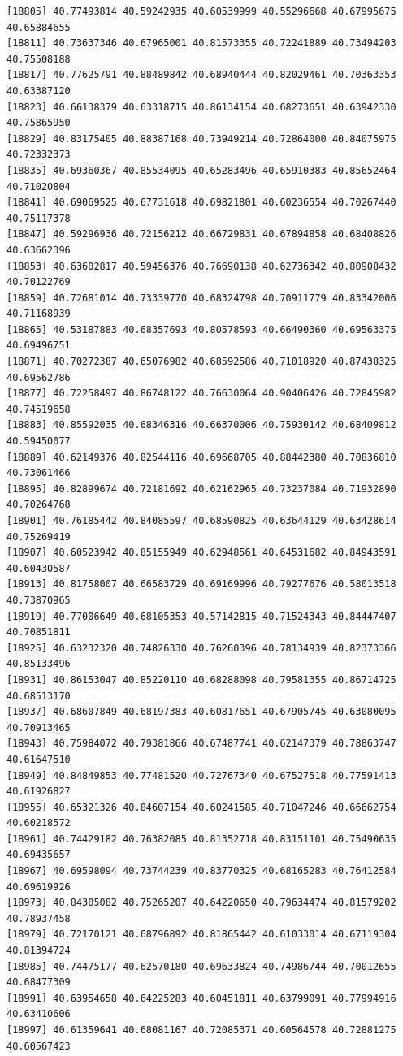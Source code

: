 \documentclass[
  letterpaper,
  DIV=11,
  numbers=noendperiod]{scrartcl}
\begin{document}
\begin{verbatim}
[18805] 40.77493814 40.59242935 40.60539999 40.55296668 40.67995675 40.65884655
[18811] 40.73637346 40.67965001 40.81573355 40.72241889 40.73494203 40.75508188
[18817] 40.77625791 40.88489842 40.68940444 40.82029461 40.70363353 40.63387120
[18823] 40.66138379 40.63318715 40.86134154 40.68273651 40.63942330 40.75865950
[18829] 40.83175405 40.88387168 40.73949214 40.72864000 40.84075975 40.72332373
[18835] 40.69360367 40.85534095 40.65283496 40.65910383 40.85652464 40.71020804
[18841] 40.69069525 40.67731618 40.69821801 40.60236554 40.70267440 40.75117378
[18847] 40.59296936 40.72156212 40.66729831 40.67894858 40.68408826 40.63662396
[18853] 40.63602817 40.59456376 40.76690138 40.62736342 40.80908432 40.70122769
[18859] 40.72681014 40.73339770 40.68324798 40.70911779 40.83342006 40.71168939
[18865] 40.53187883 40.68357693 40.80578593 40.66490360 40.69563375 40.69496751
[18871] 40.70272387 40.65076982 40.68592586 40.71018920 40.87438325 40.69562786
[18877] 40.72258497 40.86748122 40.76630064 40.90406426 40.72845982 40.74519658
[18883] 40.85592035 40.68346316 40.66370006 40.75930142 40.68409812 40.59450077
[18889] 40.62149376 40.82544116 40.69668705 40.88442380 40.70836810 40.73061466
[18895] 40.82899674 40.72181692 40.62162965 40.73237084 40.71932890 40.70264768
[18901] 40.76185442 40.84085597 40.68590825 40.63644129 40.63428614 40.75269419
[18907] 40.60523942 40.85155949 40.62948561 40.64531682 40.84943591 40.60430587
[18913] 40.81758007 40.66583729 40.69169996 40.79277676 40.58013518 40.73870965
[18919] 40.77006649 40.68105353 40.57142815 40.71524343 40.84447407 40.70851811
[18925] 40.63232320 40.74826330 40.76260396 40.78134939 40.82373366 40.85133496
[18931] 40.86153047 40.85220110 40.68288098 40.79581355 40.86714725 40.68513170
[18937] 40.68607849 40.68197383 40.60817651 40.67905745 40.63080095 40.70913465
[18943] 40.75984072 40.79381866 40.67487741 40.62147379 40.78863747 40.61647510
[18949] 40.84849853 40.77481520 40.72767340 40.67527518 40.77591413 40.61926827
[18955] 40.65321326 40.84607154 40.60241585 40.71047246 40.66662754 40.60218572
[18961] 40.74429182 40.76382085 40.81352718 40.83151101 40.75490635 40.69435657
[18967] 40.69598094 40.73744239 40.83770325 40.68165283 40.76412584 40.69619926
[18973] 40.84305082 40.75265207 40.64220650 40.79634474 40.81579202 40.78937458
[18979] 40.72170121 40.68796892 40.81865442 40.61033014 40.67119304 40.81394724
[18985] 40.74475177 40.62570180 40.69633824 40.74986744 40.70012655 40.68477309
[18991] 40.63954658 40.64225283 40.60451811 40.63799091 40.77994916 40.63410606
[18997] 40.61359641 40.68081167 40.72085371 40.60564578 40.72881275 40.60567423

\end{verbatim}
\end{document}
